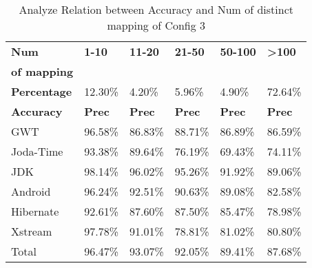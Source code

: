 \begin{table}[]
\tiny
\centering
\caption{Analyze Relation between Accuracy and Num of distinct mapping of Config 3}
\begin{tabular}{|l|l|l|l|l|l|}
\hline
              
\textbf{Num }& \textbf{1-10}        & \textbf{11-20}       & \textbf{21-50}       & \textbf{50-100}      & \textbf{\textgreater{}100}     \\
\textbf{of mapping }&         &        &        &       &      \\ \hline
\textbf{Percentage  }   & 12.30\%     & 4.20\%      & 5.96\%      & 4.90\%      & 72.64\%               \\ \hline
\textbf{Accuracy }      & \textbf{Prec}        & \textbf{Prec}        & \textbf{Prec}        & \textbf{Prec}        & \textbf{Prec}                  \\ \hline
GWT            & 96.58\%     & 86.83\%     & 88.71\%     & 86.89\%     & 86.59\%               \\ \hline
Joda-Time      & 93.38\%     & 89.64\%     & 76.19\%     & 69.43\%     & 74.11\%               \\ \hline
JDK            & 98.14\%     & 96.02\%     & 95.26\%     & 91.92\%     & 89.06\%               \\ \hline
Android        & 96.24\%     & 92.51\%     & 90.63\%     & 89.08\%     & 82.58\%               \\ \hline
Hibernate      & 92.61\%     & 87.60\%     & 87.50\%     & 85.47\%     & 78.98\%               \\ \hline
Xstream        & 97.78\%     & 91.01\%     & 78.81\%     & 81.02\%     & 80.80\%               \\ \hline
Total          & 96.47\%     & 93.07\%     & 92.05\%     & 89.41\%     & 87.68\%               \\ \hline
\end{tabular}

\label{tbl:Analyze1}
\end{table}







